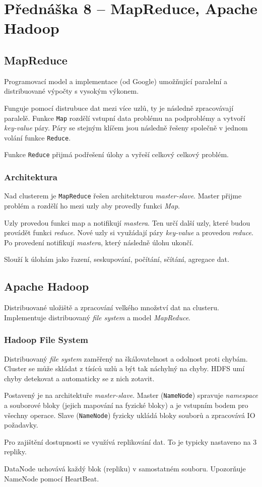 \section{Přednáška 8 -- MapReduce, Apache Hadoop}

\subsection*{MapReduce}

Programovací model a implementace (od Google) umožňující paralelní a distribuované výpočty s vysokým výkonem.

Funguje pomocí distrubuce dat mezi více uzlů, ty je následně zpracovávají paralelě.
Funkce \texttt{Map} rozdělí vstupní data problému na podproblémy a vytvoří \textit{key-value} páry.
Páry se stejným klíčem jsou následně řešeny společně v jednom volání funkce \texttt{Reduce}.

Funkce \texttt{Reduce} přijmá podřešení úlohy a vyřeší celkový celkový problém.

\subsubsection*{Architektura}

Nad clusterem je \texttt{MapReduce} řešen architekturou \textit{master-slave}.
Master přijme problém a rozdělí ho mezi uzly aby provedly funkci \textit{Map}.

Uzly provedou funkci map a notifikují \textit{mastera}.
Ten určí další uzly, které budou provádět funkci \textit{reduce}.
Nové uzly si využádají páry \textit{key-value} a provedou \textit{reduce}.
Po provedení notifikují \textit{mastera}, který následně úlohu ukončí.

Slouží k úlohám jako řazení, seskupování, počítání, sčítání, agregace dat.

\subsection*{Apache Hadoop}

Distribuované uložiště a zpracování velkého množství dat na clusteru.
Implementuje distribuovaný \textit{file system} a model \textit{MapReduce}.

\subsubsection*{Hadoop File System}

Distribuovaný \textit{file system} zaměřený na škálovatelnost a odolnost proti chybám.
Cluster se může skládat z tísíců uzlů a být tak náchylný na chyby.
HDFS umí chyby detekovat a automaticky se z nich zotavit.

Postavený je na architektuře \textit{master-slave}. Master (\texttt{NameNode}) spravuje \textit{namespace} a souborové bloky (jejich mapování na fyzické bloky) a je vstupním bodem pro všechny operace.
Slave (\texttt{NameNode}) fyzicky ukládá bloky souborů a zpracovává IO požadavky.

Pro zajištění dostupnosti se využívá replikování dat.
To je typicky nastaveno na 3 repliky.

DataNode uchovává každý blok (repliku) v samostatném souboru.
Upozorňuje NameNode pomocí HeartBeat.
